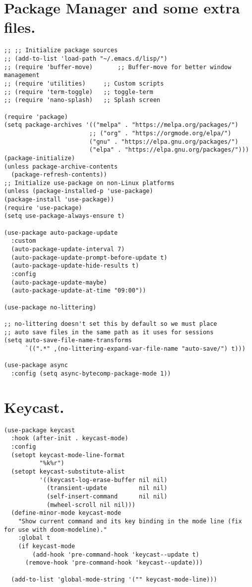 \documentclass[11pt]{article}
\begin{document}
\section{Package Manager and some extra files.}
\label{sec:org75858c3}
\begin{verbatim}
;; ;; Initialize package sources
;; (add-to-list 'load-path "~/.emacs.d/lisp/")
;; (require 'buffer-move)   	;; Buffer-move for better window management
;; (require 'utilities)		;; Custom scripts
;; (require 'term-toggle)	;; toggle-term
;; (require 'nano-splash)	;; Splash screen

(require 'package)
(setq package-archives '(("melpa" . "https://melpa.org/packages/")
                        ;; ("org" . "https://orgmode.org/elpa/")
                        ("gnu" . "https://elpa.gnu.org/packages/")
                        ("elpa" . "https://elpa.gnu.org/packages/")))
(package-initialize)
(unless package-archive-contents
  (package-refresh-contents))
;; Initialize use-package on non-Linux platforms
(unless (package-installed-p 'use-package)
(package-install 'use-package))
(require 'use-package)
(setq use-package-always-ensure t)

(use-package auto-package-update
  :custom
  (auto-package-update-interval 7)
  (auto-package-update-prompt-before-update t)
  (auto-package-update-hide-results t)
  :config
  (auto-package-update-maybe)
  (auto-package-update-at-time "09:00"))

(use-package no-littering)

;; no-littering doesn't set this by default so we must place
;; auto save files in the same path as it uses for sessions
(setq auto-save-file-name-transforms
      `((".*" ,(no-littering-expand-var-file-name "auto-save/") t)))

(use-package async
  :config (setq async-bytecomp-package-mode 1))
\end{verbatim}
\section{Keycast.}
\label{sec:orge661284}
\begin{verbatim}
(use-package keycast
  :hook (after-init . keycast-mode)
  :config
  (setopt keycast-mode-line-format
          "%k%r")
  (setopt keycast-substitute-alist
          '((keycast-log-erase-buffer nil nil)
            (transient-update         nil nil)
            (self-insert-command      nil nil)
            (mwheel-scroll nil nil)))
  (define-minor-mode keycast-mode
    "Show current command and its key binding in the mode line (fix for use with doom-modeline)."
    :global t
    (if keycast-mode
        (add-hook 'pre-command-hook 'keycast--update t)
      (remove-hook 'pre-command-hook 'keycast--update)))

  (add-to-list 'global-mode-string '("" keycast-mode-line)))
\end{verbatim}
\end{document}
